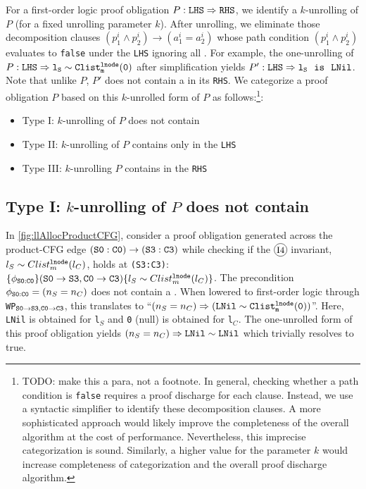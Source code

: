 For a first-order
logic proof obligation
$P: {\tt LHS}\Rightarrow{\tt RHS}$, we identify
a $k$-unrolling of $P$ (for a fixed unrolling parameter $k$).
After unrolling,
we eliminate those decomposition clauses
$(p^i_1\land{}p^i_2)\rightarrow{}(a^i_1=a^i_2)$ whose
path condition $(p^i_1\land{}p^i_2)$ evaluates to {\tt false}
under the {\tt LHS} ignoring all \recursiveRelations{}.
For example, the one-unrolling
of $P: {\tt LHS}\Rightarrow{}{\tt l_S\ensuremath{\sim}{}Clist^{{\tt lnode}}_{m}(0)}$
after simplification yields
$P': {\tt LHS}\Rightarrow{}{\tt l_S\ \ is\ \ LNil}$.
Note that unlike $P$, $P'$ does not contain a \recursiveRelation{} in its {\tt RHS}.
We categorize a proof obligation $P$ based
on this $k$-unrolled form of $P$ as follows:\footnote{TODO: make this a para, not a footnote. In general, checking whether a path condition is {\tt false} requires a proof discharge for each clause.
Instead, we use a syntactic simplifier to identify these decomposition clauses.
A more sophisticated approach would likely improve the completeness of the overall algorithm at the cost of performance.
Nevertheless, this imprecise categorization is sound.
Similarly, a higher value for the parameter $k$ would increase completeness of categorization and the overall proof discharge algorithm.}:
\begin{itemize}
    \item Type I: $k$-unrolling of $P$ does not contain \recursiveRelations{}
    \item Type II: $k$-unrolling of $P$ contains \recursiveRelations{} only in the {\tt LHS}
    \item Type III: $k$-unrolling $P$ contains \recursiveRelations{} in the {\tt RHS}
\end{itemize}

\subsection[Handling Type I Proof Obligations]{Type I: $k$-unrolling of $P$ does not contain \recursiveRelations{}}
\label{sec:cat1}
In \cref{fig:llAllocProductCFG}, consider a proof obligation generated
across the product-CFG edge ${\tt (S0:C0) \rightarrow (S3:C3)}$
while checking if the ${\small \circled{I4}}$ invariant, $l_{S}\sim{}Clist^{{\tt lnode}}_{m}(l_{C})$,
holds at {\tt (S3:C3)}:
$\{\phi_{{\tt S0:C0}}\} ({\tt S0\rightarrow S3}, {\tt C0\rightarrow C3}) \{l_{S}\sim{}Clist^{{\tt lnode}}_{m}(l_{C})\}$.
The precondition $\phi_{{\tt S0:C0}}=(n_S=n_C)$ does not contain
a \recursiveRelation{}.
When lowered to first-order logic through {\tt WP$_{{\tt S0\rightarrow S3},{\tt C0\rightarrow C3}}$}, this translates to
``$(n_S=n_C)\Rightarrow({\tt LNil}\sim{}{\tt Clist^{{\tt lnode}}_{m}(0)})$''.
Here, {\tt LNil} is obtained for {\tt l$_{S}$} and {\tt 0} (null) is
obtained for {\tt l$_C$}.
The one-unrolled form of this proof obligation yields
$(n_S=n_C)\Rightarrow{}{\tt LNil}\sim{}{\tt LNil}$ which trivially resolves to true.

